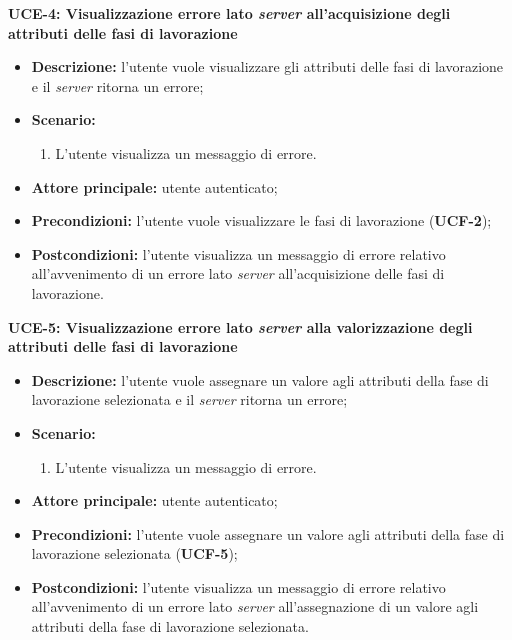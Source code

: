         \textbf{UCE-4: Visualizzazione errore lato \textit{server} all’acquisizione degli attributi delle fasi di lavorazione}
        \begin{itemize}
            \item \textbf{Descrizione:} l’utente vuole visualizzare gli attributi delle fasi di lavorazione e il \textit{server} ritorna un errore;
            \item \textbf{Scenario:}
                \begin{enumerate}
                    \item L’utente visualizza un messaggio di errore.
                \end{enumerate}
            \item \textbf{Attore principale:} utente autenticato;
            \item \textbf{Precondizioni:} l’utente vuole visualizzare le fasi di lavorazione (\textbf{UCF-2});
            \item \textbf{Postcondizioni:} l’utente visualizza un messaggio di errore relativo all’avvenimento di un errore lato \textit{server} all’acquisizione delle fasi di lavorazione.
        \end{itemize}

        \textbf{UCE-5: Visualizzazione errore lato \textit{server} alla valorizzazione degli attributi delle fasi di lavorazione}
        \begin{itemize}
            \item \textbf{Descrizione:} l’utente vuole assegnare un valore agli attributi della fase di lavorazione selezionata e il \textit{server} ritorna un errore;
            \item \textbf{Scenario:}
                \begin{enumerate}
                    \item L’utente visualizza un messaggio di errore.
                \end{enumerate}
            \item \textbf{Attore principale:} utente autenticato;
            \item \textbf{Precondizioni:} l’utente vuole assegnare un valore agli attributi della fase di lavorazione selezionata (\textbf{UCF-5});
            \item \textbf{Postcondizioni:} l’utente visualizza un messaggio di errore relativo all’avvenimento di un errore lato \textit{server} all’assegnazione di un valore agli attributi della fase di lavorazione selezionata.
        \end{itemize}

